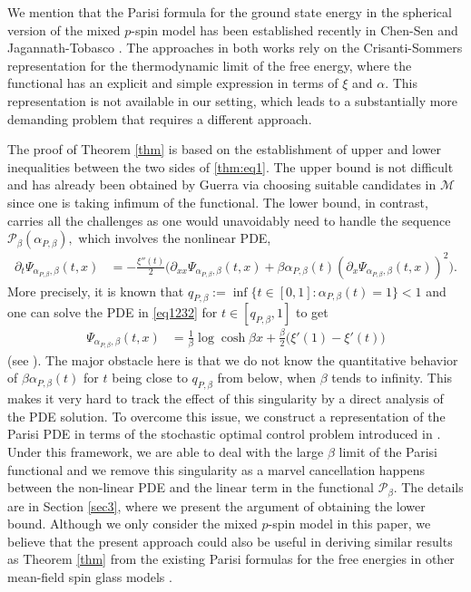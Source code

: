 \documentclass[12pt]{article}
\newenvironment{Proof of lemma}{\noindent{\bf Proof of Lemma}}{\hfill$\Box$\newline}
\newenvironment{Proof of theorem}{\noindent{\bf Proof of Theorem}}{\hfill{\footnotesize${\square}$}\newline}
\newenvironment{Proof of theorems}{\noindent{\bf Proof of Theorems}}{\hfill$\Box$\newline}
\newenvironment{Proof of proposition}{\noindent{\bf Proof of Proposition}}{\hfill$\Box$\newline}
\newenvironment{Proof of propositions}{\noindent{\bf Proof of Propositions}}{\hfill$\Box$\newline}
\newenvironment{Proof of exercise}{\noindent{\it Proof of Exercise:}}{\hfill$\Box$}
\begin{document}
We mention that the Parisi formula for the ground state energy in the spherical version of the mixed $p$-spin model has been established recently in Chen-Sen \cite{ArnabChen15} and Jagannath-Tobasco \cite{JT}. The approaches in both works rely on the Crisanti-Sommers representation for the thermodynamic limit of the free energy, where the functional has an explicit and simple expression in terms of $\xi$ and $\alpha.$ This representation is not available in our setting, which leads to a substantially more demanding problem that requires a different approach.%

The proof of Theorem \ref{thm} is based on the establishment of upper and lower inequalities between the two sides of \eqref{thm:eq1}. The upper bound is not difficult and has already been obtained by Guerra \cite[Theorem 6]{G} via choosing suitable candidates in $\mathcal{M}$ since one is taking infimum of the functional. The lower bound, in contrast, carries all the challenges as one would unavoidably need to handle the sequence $\mathcal{P}_{\beta}(\alpha_{P,\beta}),$ which involves the nonlinear PDE, %
\begin{align}\label{eq1232}
\partial_t\Psi_{\alpha_{P,\beta},\beta}(t,x)&=-\frac{\xi''(t)}{2}\bigl(\partial_{xx}\Psi_{\alpha_{P,\beta},\beta}(t,x)+\beta\alpha_{P,\beta}(t)(\partial_x\Psi_{\alpha_{P,\beta},\beta}(t,x))^2\bigr).
\end{align} 
More precisely, it is known that $q_{P,\beta}:=\inf\{t\in[0,1]:\alpha_{P,\beta}(t)=1\}<1$ and one can solve the PDE in \eqref{eq1232} for $t\in [q_{P,\beta},1]$ to get
\begin{align*}
\Psi_{\alpha_{P,\beta},\beta}(t,x)&=\frac{1}{\beta}\log \cosh \beta x+\frac{\beta}{2}\bigl(\xi'(1)-\xi'(t)\bigr)
\end{align*} 
 (see \cite[Chapter 14]{T11}).
The major obstacle here is that we do not know the quantitative behavior of $\beta\alpha_{P,\beta}(t)$ for $t$ being close to $q_{P,\beta}$ from below, when $\beta$ tends to infinity. This makes it very hard to track the effect of this singularity by a direct analysis of the PDE solution. To overcome this issue, we construct a representation of the Parisi PDE in terms of the  stochastic optimal control problem introduced in \cite{AC14,BK}. Under this framework, we are able to deal with the large $\beta$ limit of the Parisi functional and we remove this singularity as a marvel cancellation happens between the non-linear PDE  and the linear term in the functional $\mathcal{P}_\beta$. The details are in Section \ref{sec3}, where we present the argument of obtaining the lower bound.  Although we only consider the mixed $p$-spin model in this paper, we believe that the present approach could also be useful in deriving similar results as Theorem \ref{thm} from the existing Parisi formulas for the free energies in other mean-field spin glass models \cite{P05,P15,P152,P153}. 
\end{document}
